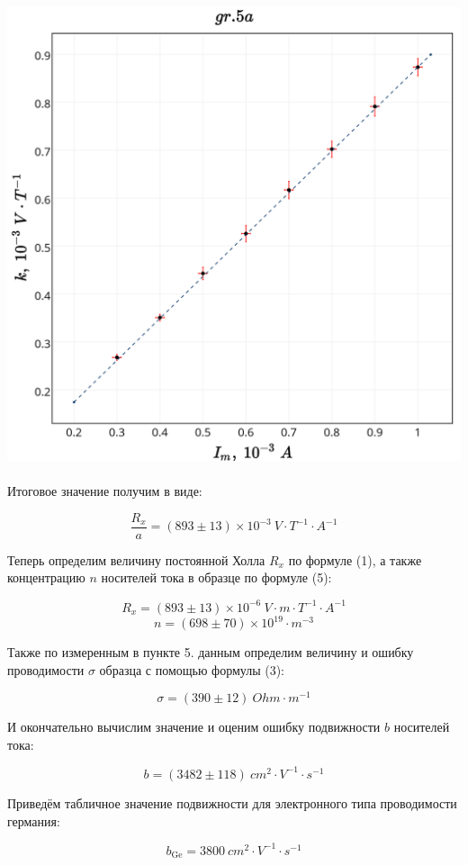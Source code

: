 \includegraphics[scale = 0.20]{my_plot5a.png}\\
\\
\newpage
Итоговое значение получим в виде:

$$\boxed{\frac{R_x}{a} = (893 \pm 13) \times 10^{-3}~V \cdot T^{-1} \cdot A^{-1}}$$

Теперь определим величину постоянной Холла $R_x$ по формуле (1), а также концентрацию $n$ носителей тока в образце по формуле (5):

$$\boxed{R_x = (893 \pm 13) \times 10^{-6}~V \cdot m \cdot T^{-1} \cdot A^{-1}}$$
$$\boxed{n = (698 \pm 70) \times 10^{19} \cdot m^{-3}}$$

Также по измеренным в пункте 5. данным определим величину и ошибку проводимости $\sigma$ образца с помощью формулы (3):

$$\boxed{\sigma = (390 \pm 12)~Ohm\cdot m^{-1}}$$

И окончательно вычислим значение и оценим ошибку подвижности $b$ носителей тока:

$$\boxed{b = (3482 \pm 118)~cm^2 \cdot V^{-1} \cdot s^{-1}}$$

Приведём табличное значение подвижности для электронного типа проводимости германия:

$$\boxed{b_{\text{Ge}} = 3800~cm^2 \cdot V^{-1} \cdot s^{-1}}$$

